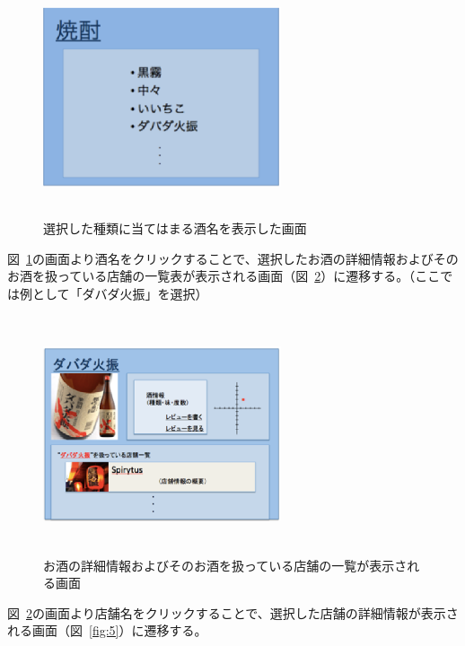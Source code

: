 \documentclass[a4j,titlepage]{jarticle}
\begin{document}
\begin {figure}[!htbp]
    \begin{center}
    \includegraphics [height=7cm, width=7cm]{3.eps}
      \caption {選択した種類に当てはまる酒名を表示した画面}
    \label {fig:3}
    \end{center}
\end {figure}
図~\ref{fig:3}の画面より酒名をクリックすることで、選択したお酒の詳細情報およびそのお酒を扱っている店舗の一覧表が表示される画面（図~\ref{fig:4}）に遷移する。（ここでは例として「ダバダ火振」を選択）
\clearpage
\begin {figure}[!htbp]
    \begin{center}
    \includegraphics [height=7cm, width=7cm]{4.eps}
    \caption {お酒の詳細情報およびそのお酒を扱っている店舗の一覧が表示される画面}
    \label {fig:4}
    \end{center}
\end {figure}



図~\ref{fig:4}の画面より店舗名をクリックすることで、選択した店舗の詳細情報が表示される画面（図~\ref{fig:5}）に遷移する。
\end{document}
